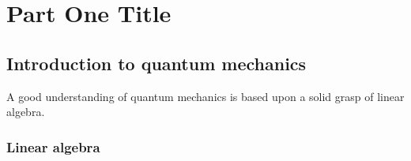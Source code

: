 \documentclass[
	11pt, %
	fleqn, %
	a4paper, %
]{LegrandOrangeBook}
\begin{document}


\pagestyle{empty} %

\tableofcontents %



\pagestyle{fancy} %

\cleardoublepage %


\part{Part One Title}


\chapterspaceabove{6.75cm} %
\chapterspacebelow{7.25cm} %


\chapter{Introduction to quantum mechanics}

A good understanding of quantum mechanics is based upon a solid grasp of linear algebra. 

\section{Linear algebra} %
\end{document}
